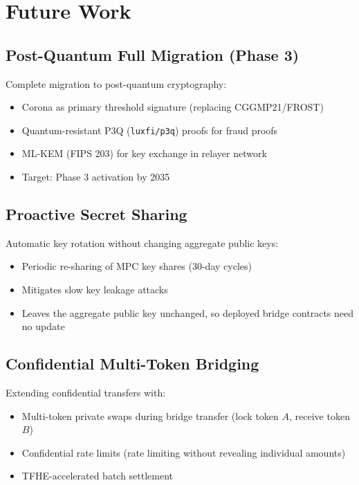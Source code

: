 \section{Future Work}


\subsection{Post-Quantum Full Migration (Phase 3)}

Complete migration to post-quantum cryptography:
\begin{itemize}[leftmargin=1.1em]
  \item Corona as primary threshold signature (replacing CGGMP21/FROST)
  \item Quantum-resistant P3Q (\texttt{luxfi/p3q}) proofs for fraud proofs
  \item ML-KEM (FIPS 203) for key exchange in relayer network
  \item Target: Phase 3 activation by 2035
\end{itemize}

\subsection{Proactive Secret Sharing}

Automatic key rotation without changing aggregate public keys:
\begin{itemize}[leftmargin=1.1em]
  \item Periodic re-sharing of MPC key shares (30-day cycles)
  \item Mitigates slow key leakage attacks
  \item Leaves the aggregate public key unchanged, so deployed bridge contracts need no update
\end{itemize}

\subsection{Confidential Multi-Token Bridging}

Extending confidential transfers with:
\begin{itemize}[leftmargin=1.1em]
  \item Multi-token private swaps during bridge transfer (lock token $A$, receive token $B$)
  \item Confidential rate limits (rate limiting without revealing individual amounts)
  \item TFHE-accelerated batch settlement
\end{itemize}

